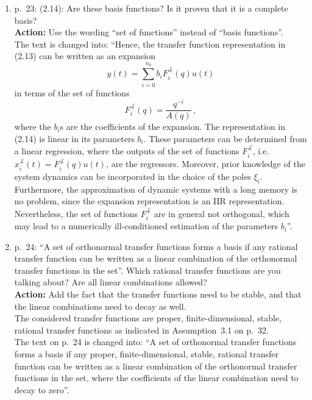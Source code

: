\documentclass{article}
\newenvironment{answer}{\noindent\ignorespaces\color{blue}}{\noindent\ignorespacesafterend}
\newcommand{\ans}[1]{\begin{answer}#1\end{answer}}
\newcommand{\action}[1]{\textbf{Action:} #1}
\newcommand{\oldnewpage}[2]{\marginpar{{\color{black}#1} / {\color{red}#2}}}
\begin{document}
\begin{enumerate}
	\item p.~23: (2.14): Are these basis functions? Is it proven that it is a complete basis?\\
		\action{Use the wording ``set of functions'' instead of ``basis functions''.}\\
		\ans{\oldnewpage{23}{25}The text is changed into: ``Hence, the transfer function representation in (2.13) can be written as an expansion \begin{equation*}y(t) = \sum_{i=0}^{n_b} b_i F_i^{\not\perp}(q) u(t) \tag*{(2.14)}\end{equation*} in terms of the set of functions \begin{equation*}F_i^{\not\perp}(q) = \frac{q^{-i}}{A(q)} \, ,\end{equation*} where the $b_i$s are the coefficients of the expansion. The representation in (2.14) is linear in its parameters $b_i$. These parameters can be determined from a linear regression, where the outputs of the set of functions $F_i^{\not\perp}$, i.e. \mbox{$x_i^{\not\perp}(t) = F_i^{\not\perp}(q) u(t)$}, are the regressors. Moreover, prior knowledge of the system dynamics can be incorporated in the choice of the poles $\xi_i$. Furthermore, the approximation of dynamic systems with a long memory is no problem, since the expansion representation is an IIR representation. Nevertheless, the set of functions $F_i^{\not\perp}$ are in general not orthogonal, which may lead to a numerically ill-conditioned estimation of the parameters $b_i$''.}

	\item p.~24: ``A set of orthonormal transfer functions forms a basis if any rational transfer function can be written as a linear combination of the orthonormal transfer functions in the set''. Which rational transfer functions are you talking about? Are all linear combinations allowed?\\
		\action{Add the fact that the transfer functions need to be stable, and that the linear combinations need to decay as well.}\\
		\ans{\oldnewpage{32}{36}The considered transfer functions are proper, finite-dimensional, stable, rational transfer functions as indicated in Assumption~3.1 on p.~32.\\
			\oldnewpage{24}{26}The text on p.~24 is changed into: ``A set of orthonormal transfer functions forms a basis if any proper, finite-dimensional, stable, rational transfer function can be written as a linear combination of the orthonormal transfer functions in the set, where the coefficients of the linear combination need to decay to zero''.}


\end{enumerate}
\end{document}
